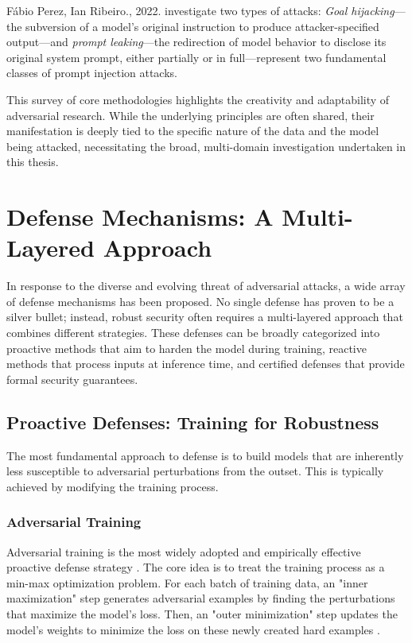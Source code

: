 \documentclass[../main.tex]{subfiles}
\begin{document}
Fábio Perez, Ian Ribeiro., 2022. \cite{perez2022ignorepreviouspromptattack} investigate two types of attacks: \emph{Goal hijacking}---the subversion of a model's original instruction to produce attacker-specified output---and \emph{prompt leaking}---the redirection of model behavior to disclose its original system prompt, either partially or in full---represent two fundamental classes of prompt injection attacks.

This survey of core methodologies highlights the creativity and adaptability of adversarial research. While the underlying principles are often shared, their manifestation is deeply tied to the specific nature of the data and the model being attacked, necessitating the broad, multi-domain investigation undertaken in this thesis.


\section{Defense Mechanisms: A Multi-Layered Approach}
\label{sec:defense_mechanisms}

In response to the diverse and evolving threat of adversarial attacks, a wide array of defense mechanisms has been proposed. No single defense has proven to be a silver bullet; instead, robust security often requires a multi-layered approach that combines different strategies. These defenses can be broadly categorized into proactive methods that aim to harden the model during training, reactive methods that process inputs at inference time, and certified defenses that provide formal security guarantees.

\subsection{Proactive Defenses: Training for Robustness}
The most fundamental approach to defense is to build models that are inherently less susceptible to adversarial perturbations from the outset. This is typically achieved by modifying the training process.

\subsubsection{Adversarial Training}
Adversarial training is the most widely adopted and empirically effective proactive defense strategy \cite{goodfellow2015explaining}. The core idea is to treat the training process as a min-max optimization problem. For each batch of training data, an "inner maximization" step generates adversarial examples by finding the perturbations that maximize the model's loss. Then, an "outer minimization" step updates the model's weights to minimize the loss on these newly created hard examples \cite{madry2018towardspgd}.
\end{document}

